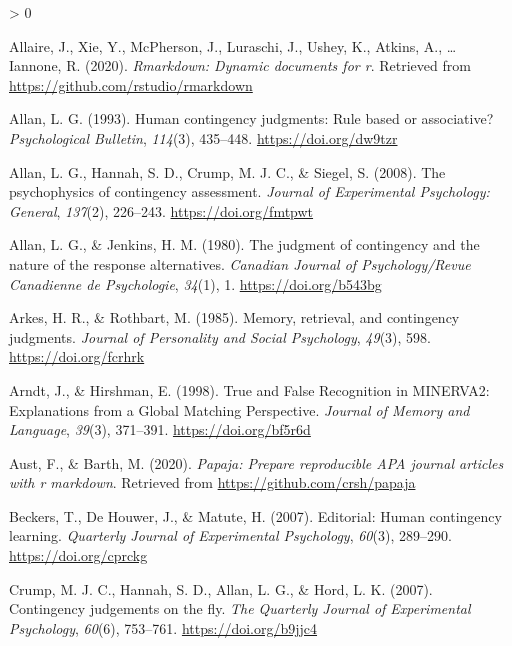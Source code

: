 \documentclass[
  english,
  man,floatsintext]{apa6}
\newlength{\cslhangindent}
\newenvironment{CSLReferences}[2] %
 {%
  \setlength{\parindent}{0pt}
  \ifodd #1 \everypar{\setlength{\hangindent}{\cslhangindent}}\ignorespaces\fi
  \ifnum #2 > 0
  \setlength{\parskip}{#2\baselineskip}
  \fi
 }%
 {}
\begin{document}
\hypertarget{refs}{}
\begin{CSLReferences}{1}{0}
\leavevmode\hypertarget{ref-R-rmarkdown}{}%
Allaire, J., Xie, Y., McPherson, J., Luraschi, J., Ushey, K., Atkins, A., \ldots{} Iannone, R. (2020). \emph{Rmarkdown: Dynamic documents for r}. Retrieved from \url{https://github.com/rstudio/rmarkdown}

\leavevmode\hypertarget{ref-allanHumanContingencyJudgments1993}{}%
Allan, L. G. (1993). Human contingency judgments: {Rule} based or associative? \emph{Psychological Bulletin}, \emph{114}(3), 435--448. \url{https://doi.org/dw9tzr}

\leavevmode\hypertarget{ref-allanPsychophysicsContingencyAssessment2008}{}%
Allan, L. G., Hannah, S. D., Crump, M. J. C., \& Siegel, S. (2008). The psychophysics of contingency assessment. \emph{Journal of Experimental Psychology: General}, \emph{137}(2), 226--243. \url{https://doi.org/fmtpwt}

\leavevmode\hypertarget{ref-allanJudgmentContingencyNature1980}{}%
Allan, L. G., \& Jenkins, H. M. (1980). The judgment of contingency and the nature of the response alternatives. \emph{Canadian Journal of Psychology/Revue Canadienne de Psychologie}, \emph{34}(1), 1. \url{https://doi.org/b543bg}

\leavevmode\hypertarget{ref-arkesMemoryRetrievalContingency1985}{}%
Arkes, H. R., \& Rothbart, M. (1985). Memory, retrieval, and contingency judgments. \emph{Journal of Personality and Social Psychology}, \emph{49}(3), 598. \url{https://doi.org/fcrhrk}

\leavevmode\hypertarget{ref-arndtTrueFalseRecognition1998}{}%
Arndt, J., \& Hirshman, E. (1998). True and {False Recognition} in {MINERVA2}: {Explanations} from a {Global Matching Perspective}. \emph{Journal of Memory and Language}, \emph{39}(3), 371--391. \url{https://doi.org/bf5r6d}

\leavevmode\hypertarget{ref-R-papaja}{}%
Aust, F., \& Barth, M. (2020). \emph{Papaja: Prepare reproducible APA journal articles with r markdown}. Retrieved from \url{https://github.com/crsh/papaja}

\leavevmode\hypertarget{ref-beckersEditorialHumanContingency2007}{}%
Beckers, T., De Houwer, J., \& Matute, H. (2007). Editorial: {Human} contingency learning. \emph{Quarterly Journal of Experimental Psychology}, \emph{60}(3), 289--290. \url{https://doi.org/cprckg}

\leavevmode\hypertarget{ref-crumpContingencyJudgementsFly2007}{}%
Crump, M. J. C., Hannah, S. D., Allan, L. G., \& Hord, L. K. (2007). Contingency judgements on the fly. \emph{The Quarterly Journal of Experimental Psychology}, \emph{60}(6), 753--761. \url{https://doi.org/b9jjc4}


\end{CSLReferences}
\end{document}
